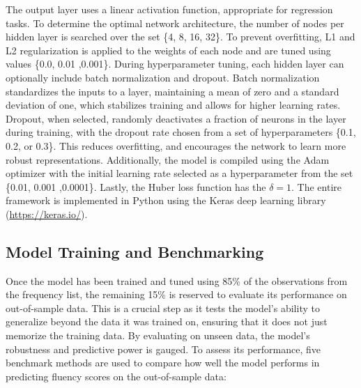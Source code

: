 \documentclass[a4paper,11pt]{report}
\begin{document}
The output layer uses a linear activation function, appropriate for regression tasks. To determine the optimal network architecture, the number of nodes per hidden layer is searched over the set \{4, 8, 16, 32\}. To prevent overfitting, L1 and L2 regularization is applied to the weights of each node and are tuned using values \{0.0, 0.01 ,0.001\}. During hyperparameter tuning, each hidden layer can optionally include batch normalization and dropout. Batch normalization standardizes the inputs to a layer, maintaining a mean of zero and a standard deviation of one, which stabilizes training and allows for higher learning rates. Dropout, when selected, randomly deactivates a fraction of neurons in the layer during training, with the dropout rate chosen from a set of hyperparameters \{0.1, 0.2, or 0.3\}. This reduces overfitting, and encourages the network to learn more robust representations. Additionally, the model is compiled using the Adam optimizer \cite{adam} with the initial learning rate selected as a hyperparameter from the set \{0.01, 0.001 ,0.0001\}. Lastly, the Huber loss function has the $\delta = 1$. The entire framework is implemented in Python using the Keras deep learning library (\url{https://keras.io/}).

\subsection{Model Training and Benchmarking}
Once the model has been trained and tuned using 85\% of the observations from the frequency list, the remaining 15\% is reserved to evaluate its performance on out-of-sample data. This is a crucial step as it tests the model’s ability to generalize beyond the data it was trained on, ensuring that it does not just memorize the training data. By evaluating on unseen data, the model's robustness and predictive power is gauged. To assess its performance, five benchmark methods are used to compare how well the model performs in predicting fluency scores on the out-of-sample data: 
\end{document}
